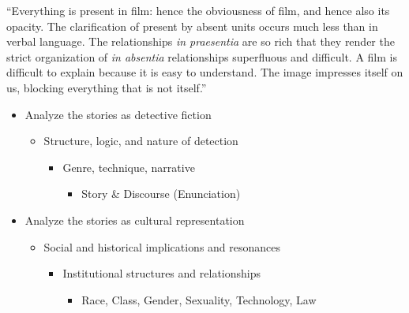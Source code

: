 \documentclass[a4paper,landscape,headrule,footrule,xetex]{foils}
\begin{document}
\begin{itemize}
\begin{quotation}
  
\end{quotation}
“Everything is present in film: hence the
obviousness of film, and hence also its opacity.
The clarification of present by absent units
occurs much less than in verbal language. The
relationships \textit{in praesentia} are so rich that
they render the strict organization of \textit{in
absentia} relationships superfluous and
difficult. A film is difficult to explain because it
is easy to understand. The image impresses
itself on us, blocking everything that is not
itself.”
\end{itemize}

\begin{itemize}
\item Analyze the stories as detective fiction
  \begin{itemize}
  \item Structure, logic, and nature of detection
    \begin{itemize}
    \item Genre, technique, narrative
      \begin{itemize}
      \item Story \& Discourse (Enunciation)
      \end{itemize}
    \end{itemize}
  \end{itemize}
\item Analyze the stories as cultural representation
  \begin{itemize}
  \item Social and historical implications and
    resonances
    \begin{itemize}
    \item Institutional structures and relationships
      \begin{itemize}
      \item Race, Class, Gender, Sexuality, Technology, Law
      \end{itemize}
    \end{itemize}
  \end{itemize}
\end{itemize}
\end{document}
